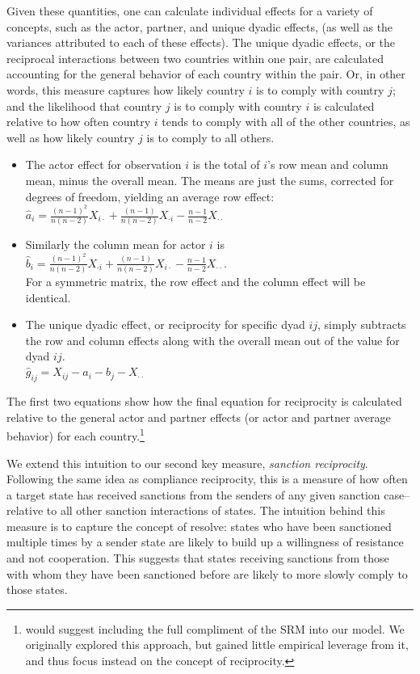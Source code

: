 Given these quantities, one can calculate individual effects for a variety of concepts, such as the actor, partner, and unique dyadic effects, (as well as the variances attributed to each of these effects). The unique dyadic effects, or the reciprocal interactions between two countries within one pair, are calculated accounting for the general behavior of each country within the pair. Or, in other words, this measure captures how likely country $i$ is to comply with country $j$; and the likelihood that country $j$ is to comply with country $i$ is calculated relative to how often country $i$ tends to comply with all of the other countries, as well as how likely country $j$ is to comply to all others. 

 \begin{itemize}
 \item The actor effect for observation $i$ is the total of $i$'s row mean and column mean, minus the overall mean.  The means are just the sums, corrected for degrees of freedom, yielding an average row effect:\\
 $\hat{a}_i = \frac{(n-1)^2}{n(n-2)} X_{i \cdot} + \frac{(n-1)}{n(n-2)} X_{\cdot i} -  \frac{n-1}{n-2} X_{\cdot \cdot} $
\item Similarly the column mean for actor $i$ is \\
 $\hat{b}_i = \frac{(n-1)^2}{n(n-2)} X_{\cdot i} + \frac{(n-1)}{n(n-2)} X_{i \cdot } -  \frac{n-1}{n-2} X_{\cdot \cdot} $.\\ For a symmetric matrix, the row effect and the column effect will be identical.
\item The unique dyadic effect, or reciprocity for specific dyad $ij$, simply subtracts the row and column effects along with the overall mean out of the value for dyad $ij$. \\
$\hat{g}_{ij} = X_{ij} - \hat{a}_i - \hat{b}_j - X_{\cdot \cdot}$
 \end{itemize}

\doublespacing
The first two equations show how the final equation for reciprocity is calculated relative to the general actor and partner effects (or actor and partner average behavior) for each country.\footnote{\cite{kenny1994interpersonal} would suggest including the full compliment of the SRM into our model. We originally explored this approach, but gained little empirical leverage from it, and thus focus instead on the concept of reciprocity.} 

We extend this intuition to our second key measure, \textit{sanction reciprocity}. Following the same idea as compliance reciprocity, this is a measure of how often a target state has received sanctions from the senders of any given sanction case--relative to all other sanction interactions of states. The intuition behind this measure is to capture the concept of resolve: states who have been sanctioned multiple times by a sender state are likely to build up a willingness of resistance and not cooperation.  This suggests that states receiving sanctions from those with whom they have been sanctioned before are likely to more slowly comply to those states. 

